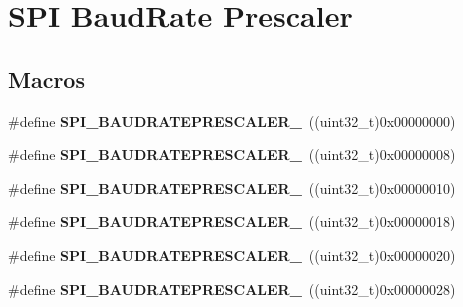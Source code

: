 \hypertarget{group___s_p_i___baud_rate___prescaler}{}\section{S\+PI Baud\+Rate Prescaler}
\label{group___s_p_i___baud_rate___prescaler}
\subsection*{Macros}
\begin{DoxyCompactItemize}
\item 
\#define {\bfseries S\+P\+I\+\_\+\+B\+A\+U\+D\+R\+A\+T\+E\+P\+R\+E\+S\+C\+A\+L\+E\+R\+\_}~((uint32\+\_\+t)0x00000000)\hypertarget{group___s_p_i___baud_rate___prescaler_ga3c1e615518e705b8120f164ff4c1968e}{}\label{group___s_p_i___baud_rate___prescaler_ga3c1e615518e705b8120f164ff4c1968e}

\item 
\#define {\bfseries S\+P\+I\+\_\+\+B\+A\+U\+D\+R\+A\+T\+E\+P\+R\+E\+S\+C\+A\+L\+E\+R\+\_}~((uint32\+\_\+t)0x00000008)\hypertarget{group___s_p_i___baud_rate___prescaler_ga807568c52b5ba449d7a2b1b85549db24}{}\label{group___s_p_i___baud_rate___prescaler_ga807568c52b5ba449d7a2b1b85549db24}

\item 
\#define {\bfseries S\+P\+I\+\_\+\+B\+A\+U\+D\+R\+A\+T\+E\+P\+R\+E\+S\+C\+A\+L\+E\+R\+\_}~((uint32\+\_\+t)0x00000010)\hypertarget{group___s_p_i___baud_rate___prescaler_ga2393359eb495f95163206e17194f4847}{}\label{group___s_p_i___baud_rate___prescaler_ga2393359eb495f95163206e17194f4847}

\item 
\#define {\bfseries S\+P\+I\+\_\+\+B\+A\+U\+D\+R\+A\+T\+E\+P\+R\+E\+S\+C\+A\+L\+E\+R\+\_}~((uint32\+\_\+t)0x00000018)\hypertarget{group___s_p_i___baud_rate___prescaler_gad6a08d920ad4ee524cf55cd09e4c4d0e}{}\label{group___s_p_i___baud_rate___prescaler_gad6a08d920ad4ee524cf55cd09e4c4d0e}

\item 
\#define {\bfseries S\+P\+I\+\_\+\+B\+A\+U\+D\+R\+A\+T\+E\+P\+R\+E\+S\+C\+A\+L\+E\+R\+\_}~((uint32\+\_\+t)0x00000020)\hypertarget{group___s_p_i___baud_rate___prescaler_ga53fda39d29f04b815f525b7f8c8dd9c2}{}\label{group___s_p_i___baud_rate___prescaler_ga53fda39d29f04b815f525b7f8c8dd9c2}

\item 
\#define {\bfseries S\+P\+I\+\_\+\+B\+A\+U\+D\+R\+A\+T\+E\+P\+R\+E\+S\+C\+A\+L\+E\+R\+\_}~((uint32\+\_\+t)0x00000028)\hypertarget{group___s_p_i___baud_rate___prescaler_ga64129361cbd23907d14144befe2209f4}{}\label{group___s_p_i___baud_rate___prescaler_ga64129361cbd23907d14144befe2209f4}


\end{DoxyCompactItemize}
